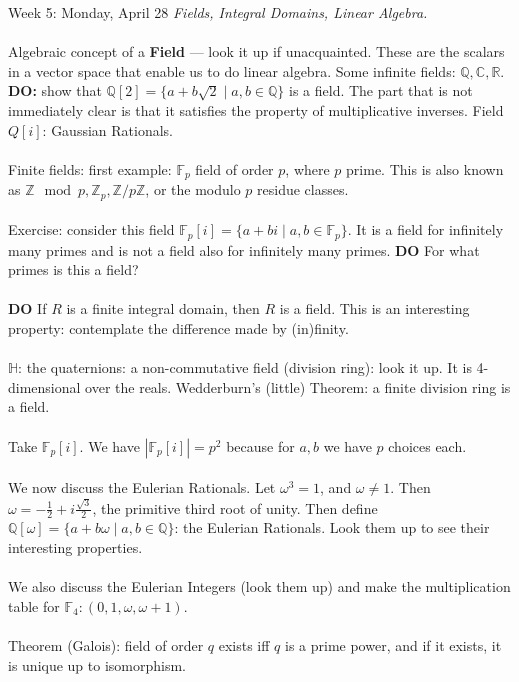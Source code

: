 \documentclass[12pt]{article}
\theoremstyle{remark}
\newcommand{\R}{\mathbb{R}}
\newcommand{\Z}{\mathbb{Z}}
\newcommand{\F}{\mathbb{F}}
\newcommand{\C}{\mathbb{C}}
\newcommand{\Q}{\mathbb{Q}}
\begin{document}
\label{13}\begin{section}{Week 5: Monday, April 28}
\indent\textit{Fields, Integral Domains, Linear Algebra.}\\\\
Algebraic concept of a \textbf{Field} --- look it up if unacquainted. These are the scalars in a vector space that enable us to do linear algebra. Some infinite fields: $\Q,\C,\R$. \textbf{DO:} show that $\Q[2] = \{a + b\sqrt{2} \mid a,b \in \Q\}$ is a field. The part that is not immediately clear is that it satisfies the property of multiplicative inverses. Field $Q[i]$: Gaussian Rationals.
\\\\
Finite fields: first example: $\F_p$ field of order $p$, where $p$ prime. This is also known as $\Z \mod p, \Z_p, \Z/p\Z$, or the modulo $p$ residue classes.
\\\\
Exercise: consider this field $\F_p[i] = \{a + bi \mid a,b \in \F_p \}$. It is a field for infinitely many primes and is not a field also for infinitely many primes. \textbf{DO} For what primes is this a field?
\\\\
\textbf{DO} If $R$ is a finite integral domain, then $R$ is a field. This is an interesting property: contemplate the difference made by (in)finity.
\\\\
$\mathbb{H}$: the quaternions: a non-commutative field (division ring): look it up. It is 4-dimensional over the reals. Wedderburn's (little) Theorem: a finite division ring is a field.
\\\\
Take $\F_p[i]$. We have $|\F_p[i]| = p^2$ because for $a,b$ we have $p$ choices each.
\\\\
We now discuss the Eulerian Rationals. Let $\omega^3 = 1$, and $\omega \neq 1$. Then $\omega = -\frac 12 + i \frac{\sqrt{3}}{2}$, the primitive third root of unity. Then define $\Q[\omega] = \{a + b\omega \mid a,b \in \Q \}$: the Eulerian Rationals. Look them up to see their interesting properties.
\\\\
We also discuss the Eulerian Integers (look them up) and make the multiplication table for $\F_4: (0,1,\omega,\omega+1)$.
\\\\
Theorem (Galois): field of order $q$ exists iff $q$ is a prime power, and if it exists, it is unique up to isomorphism.

\end{section}
\end{document}
